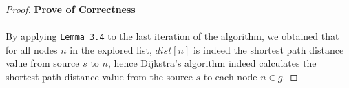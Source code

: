 \documentclass[11pt, oneside]{article}   	%
\theoremstyle{definition}
\begin{document}
\begin{proof}\textbf{Prove of Correctness}
\\\\
By applying \texttt{Lemma 3.4} to the last iteration of the algorithm, we obtained that for all nodes $n$ in the explored list, $dist[n]$ is indeed the shortest path distance value from source $s$ to $n$, hence Dijkstra's algorithm indeed calculates the shortest path distance value from the source $s$ to each node $n \in g$. 
\end{proof}
\end{document}
